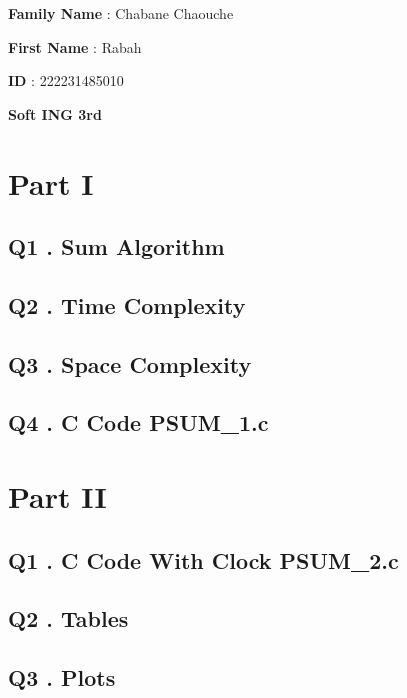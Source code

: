 \documentclass[fleqn]{article}
\begin{document}
\renewcommand{\arrayrulewidth}{0.75mm} %
\setlength{\tabcolsep}{5.5pt} %
\renewcommand{\arraystretch}{1.5} %
 \textbf{Family Name} : Chabane Chaouche

 \textbf{First Name} : Rabah

 \textbf{ID }: 222231485010

 \textbf{Soft ING 3rd}
 
 \vspace{1cm}

\section*{Part I}
\subsection*{Q1 . Sum Algorithm}


\vspace{1cm}
\subsection*{Q2 . Time Complexity}

\vspace{0.25cm}


\vspace{1cm}

\subsection*{Q3 . Space Complexity}


\vspace{0.25cm}



\vspace{1cm}

\subsection*{Q4 . C Code PSUM\_1.c}

\vspace{0.25cm}



\vspace{1cm}
\section*{Part II}
\subsection*{Q1 . C Code With Clock PSUM\_2.c}

\vspace{0.25cm}



\vspace{1cm}
\subsection*{Q2 . Tables}

\vspace{0.25cm}


\newpage
\subsection*{Q3 . Plots}

\end{document}
